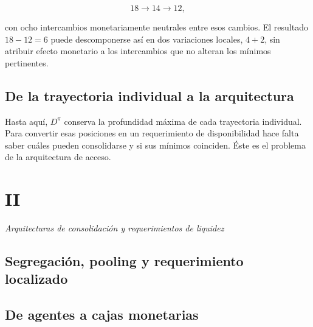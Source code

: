 \documentclass[10pt,a5paper,twoside]{article}
\begin{document}
\[
18\longrightarrow14\longrightarrow12,
\]

con ocho intercambios monetariamente neutrales entre esos cambios. El
resultado \(18-12=6\) puede descomponerse así en dos variaciones locales,
\(4+2\), sin atribuir efecto monetario a los intercambios que no alteran
los mínimos pertinentes.

\subsection{De la trayectoria individual a la arquitectura}\label{de-la-trayectoria-individual-a-la-arquitectura}

Hasta aquí, \(D^\pi\) conserva la profundidad máxima de cada trayectoria
individual. Para convertir esas posiciones en un requerimiento de
disponibilidad hace falta saber cuáles pueden consolidarse y si sus mínimos
coinciden. Éste es el problema de la arquitectura de acceso.


\cleardoublepage
\setcounter{subsection}{0}
\vspace*{6mm}\section*{II}\label{ii.-arquitecturas-de-compensaciuxf3n-y-requerimientos-de-liquidez}
\thispagestyle{plain}
{\large\itshape Arquitecturas de consolidación y requerimientos de liquidez\par}\vspace{1.2ex}

\subsection*{Segregación, pooling y requerimiento localizado}\label{segregaciuxf3n-pooling-y-requerimiento-localizado}

\subsection{De agentes a cajas monetarias}\label{de-agentes-a-cajas-monetarias}
\end{document}
